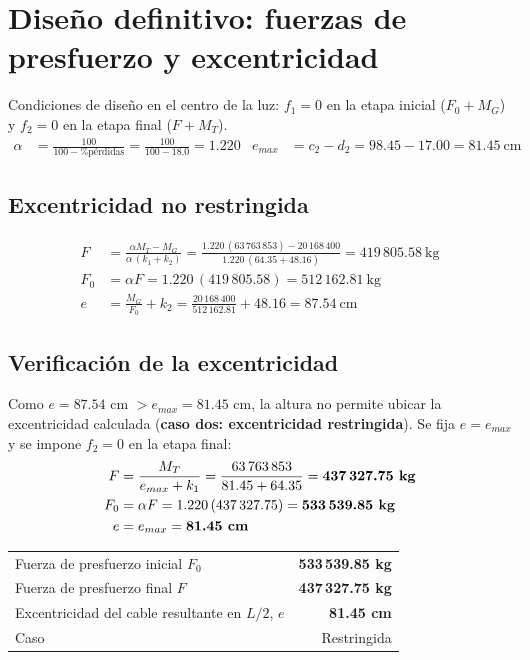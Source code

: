 \documentclass[11pt,a4paper]{article}
\begin{document}
\section{Diseño definitivo: fuerzas de presfuerzo y excentricidad}
Condiciones de diseño en el centro de la luz: $f_1 = 0$ en la etapa inicial ($F_0 + M_G$) y $f_2 = 0$ en la etapa final ($F + M_T$).
\begin{align*}
\alpha &= \frac{100}{100 - \%\text{pérdidas}} = \frac{100}{100 - 18.0} = 1.220 &
e_{max} &= c_2 - d_2 = 98.45 - 17.00 = 81.45\ \text{cm}
\end{align*}
\subsection{Excentricidad no restringida}
\begin{align*}
F &= \frac{\alpha M_T - M_G}{\alpha\,(k_1 + k_2)} = \frac{1.220\,(63\,763\,853) - 20\,168\,400}{1.220\,(64.35 + 48.16)} = 419\,805.58\ \text{kg}\\
F_0 &= \alpha F = 1.220\,(419\,805.58) = 512\,162.81\ \text{kg}\\
e &= \frac{M_G}{F_0} + k_2 = \frac{20\,168\,400}{512\,162.81} + 48.16 = 87.54\ \text{cm}
\end{align*}
\subsection{Verificación de la excentricidad}

Como $e = 87.54$ cm $> e_{max} = 81.45$ cm, la altura no permite ubicar la excentricidad calculada
(\textbf{caso dos: excentricidad restringida}). Se fija $e = e_{max}$ y se impone $f_2 = 0$ en la etapa final:
\begin{align*}
F &= \frac{M_T}{e_{max} + k_1} = \frac{63\,763\,853}{81.45 + 64.35} = \textbf{437\,327.75\ kg}\\
F_0 &= \alpha F = 1.220\,(437\,327.75) = \textbf{533\,539.85\ kg}\\
e &= e_{max} = \textbf{81.45\ cm}
\end{align*}

\begin{center}
\begin{tabular}{lr}
\toprule
Fuerza de presfuerzo inicial $F_0$ & \textbf{533\,539.85 kg} \\
Fuerza de presfuerzo final $F$ & \textbf{437\,327.75 kg} \\
Excentricidad del cable resultante en $L/2$, $e$ & \textbf{81.45 cm} \\
Caso & Restringida \\
\bottomrule
\end{tabular}
\end{center}
\end{document}
